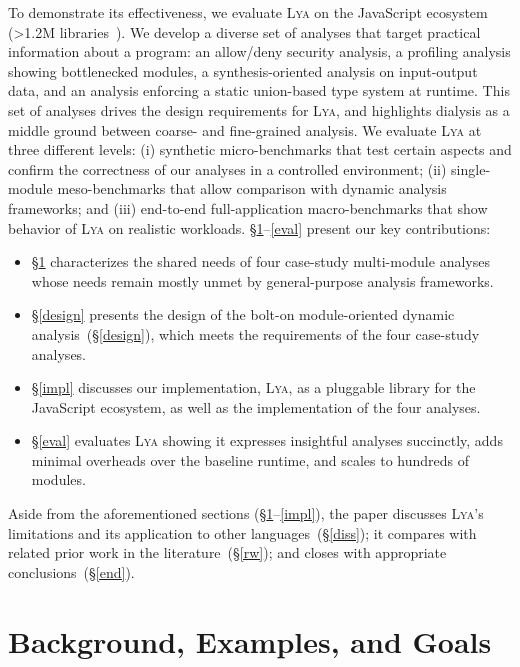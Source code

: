 \documentclass[letterpaper,twocolumn,10pt]{article}
\newcommand{\sx}[1]{(\S\ref{#1})}
\newcommand{\sys}{{\scshape Lya}\xspace}
\begin{document}
To demonstrate its effectiveness, we evaluate \sys on the JavaScript ecosystem (>1.2M libraries~\cite{modulecounts}). %
We develop a diverse set of analyses that target practical information about a program:
  an allow/deny security analysis,
  a profiling analysis showing bottlenecked modules,
  a synthesis-oriented analysis on input-output data, and
  an analysis enforcing a static union-based type system at runtime.
This set of analyses drives the design requirements for \sys, and highlights dialysis as a middle ground between coarse- and fine-grained analysis.
We evaluate \sys at three different levels:
  (i) synthetic micro-benchmarks that test certain aspects and confirm the correctness of our analyses in a controlled environment;
  (ii) single-module meso-benchmarks that allow comparison with dynamic analysis frameworks; and
  (iii) end-to-end full-application macro-benchmarks that show behavior of \sys on realistic workloads. 
\S\ref{bg}--\ref{eval} present our key contributions:
\begin{itemize}
\item \S\ref{bg} characterizes the shared needs of four case-study multi-module analyses whose needs remain mostly unmet by general-purpose analysis frameworks.
\item \S\ref{design} presents the design of the bolt-on module-oriented dynamic analysis~\sx{design}, which meets the requirements of the four case-study analyses.
\item \S\ref{impl} discusses our implementation, \sys, as a pluggable library for the JavaScript ecosystem, as well as the implementation of the four analyses.
\item \S\ref{eval} evaluates \sys showing it expresses insightful analyses succinctly, adds minimal overheads over the baseline runtime, and scales to hundreds of modules.
\end{itemize}

Aside from the aforementioned sections (\S\ref{bg}--\ref{impl}), the paper discusses \sys's limitations and its application to other languages~\sx{diss};
  it compares with related prior work in the literature~\sx{rw};
  and closes with appropriate conclusions~\sx{end}.


\section{Background, Examples, and Goals}
\label{bg}
\end{document}
